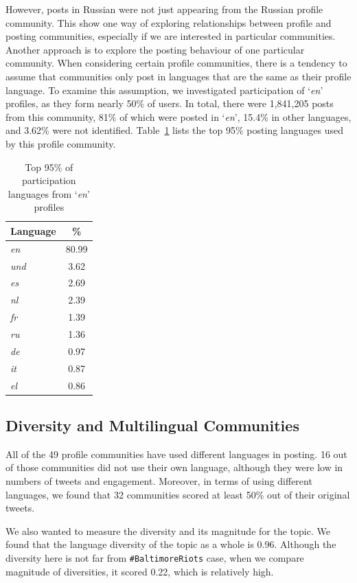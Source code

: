 \documentclass{llncs}
\begin{document}
{However, posts in Russian were not just appearing from the Russian profile
community. This show one way of exploring relationships between
profile and posting communities, especially if we are interested in
particular communities. Another approach is to explore the posting
behaviour of one particular community. When considering certain
profile communities, there is a tendency to assume that communities
only post in languages that are the same as their profile language. To
examine this assumption, we investigated participation of
`{\emph{en}}' profiles, as they form nearly 50\% of users. In total,
there were 1,841,205 posts from this community, 81\% of which were
posted in `{\emph{en}}', 15.4\% in other languages, and 3.62\% were
not identified. Table~\ref{tbl:enpartlangs} lists the top 95\% posting
languages used by this profile community.

\begin{table}[!htb]
\centering
\begin{tabular}{@{}lc}
\toprule
\textbf{Language} & \textbf{\%} \\ 
\midrule
{\emph{en}} & 80.99 \\
{\emph{und}} & 3.62 \\
{\emph{es}} & 2.69 \\
{\emph{nl}} & 2.39 \\
{\emph{fr}} & 1.39 \\
{\emph{ru}} & 1.36 \\
{\emph{de}} & 0.97 \\
{\emph{it}} & 0.87 \\ 
{\emph{el}} & 0.86 \\ 
\bottomrule
\end{tabular}
\caption{Top 95\% of participation languages from `{\emph{en}}' profiles}
\label{tbl:enpartlangs}
\end{table}

\subsection{Diversity and Multilingual Communities}

All of the 49 profile communities have used different languages in
posting. 16 out of those communities did not use their own language,
although they were low in numbers of tweets and engagement. Moreover,
in terms of using different languages, we found that 32 communities
scored at least 50\% out of their original tweets.

We also wanted to measure the diversity and its magnitude for the
topic.  We found that the language diversity of the topic as a whole
is 0.96. Although the diversity here is not far from
{\texttt{\#BaltimoreRiots}} case, when we compare magnitude of
diversities, it scored 0.22, which is relatively high.

}
\end{document}
